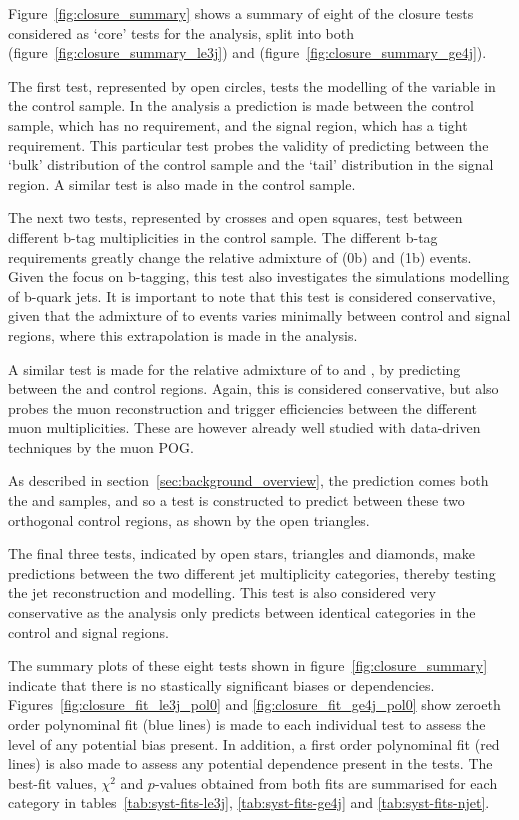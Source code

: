 Figure~\ref{fig:closure_summary} shows a summary of eight of the closure tests 
considered as `core' tests for the analysis, split into both
\njlow (figure~\ref{fig:closure_summary_le3j}) 
and \njhigh (figure~\ref{fig:closure_summary_ge4j}).

The first test, represented by open circles, tests the modelling of the \alphat 
variable in the \mj control sample. In the analysis a prediction is made 
between the \mj control sample, which has no \alphat requirement, and the 
signal region, which has a tight \alphat requirement. This particular test 
probes
the validity of predicting between the `bulk' distribution of the control sample
and the `tail' distribution in the signal region. A similar test is also made 
in the \mmj control sample.

The next two tests, represented by crosses and open squares, test between 
different b-tag multiplicities in the \mj control sample. The different b-tag 
requirements greatly change the relative admixture of \wj (0b) and \ttj (1b) events. 
Given the focus on b-tagging, this test also investigates the simulations 
modelling of b-quark jets. It is important to note that this test is 
considered conservative, given that the admixture of \wj to \ttj events 
varies minimally between control and signal regions, where this extrapolation is 
made in the analysis.

A similar test is made for the relative admixture of \zj to \wj and \ttj, by 
predicting between the \mj and \mmj control regions. Again, this is considered 
conservative, but also probes the muon reconstruction and trigger efficiencies 
between the different muon multiplicities. These are however already well 
studied with data-driven techniques by the muon POG.

As described in section~\ref{sec:background_overview}, the \zinv prediction 
comes both the \gj and \mmj samples, and so a test is constructed to 
predict between these two orthogonal control regions, as shown by the open 
triangles.

The final three tests, indicated by open stars, triangles and diamonds, make 
predictions between the two different jet multiplicity categories, thereby 
testing the jet reconstruction and modelling. This test is also considered very 
conservative as the analysis only predicts between identical \nj categories in 
the control and signal regions.

The summary plots of these eight tests shown in figure~\ref{fig:closure_summary} 
indicate that there is no stastically significant biases or \HT dependencies. 
Figures~\ref{fig:closure_fit_le3j_pol0} and \ref{fig:closure_fit_ge4j_pol0} show
zeroeth order polynominal fit (blue lines) is made to each individual test to assess the 
level of any potential bias present. In addition, a first order polynominal fit 
(red lines) is 
also made to assess any potential \HT dependence present in the tests.
The best-fit values, $\chi^2$ and $p$-values 
obtained from both fits are summarised for each \nj category in
tables~\ref{tab:syst-fits-le3j}, \ref{tab:syst-fits-ge4j} and
\ref{tab:syst-fits-njet}.

